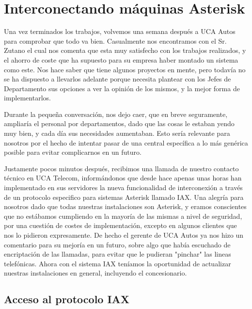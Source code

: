 \newpage

\color[rgb]{0,0,1}

\section{Interconectando máquinas Asterisk}

Una vez terminados los trabajos, volvemos una semana después a UCA Autos para comprobar que todo va bien. Casualmente nos encontramos con el Sr. Zutano el cual nos comenta que esta muy satisfecho con los trabajos realizados, y el ahorro de coste que ha supuesto para su empresa haber montado un sistema como este. Nos hace saber que tiene algunos proyectos en mente, pero todavía no se ha dispuesto a llevarlos adelante porque necesita plantear con los Jefes de Departamento sus opciones a ver la opinión de los mismos, y la mejor forma de implementarlos. 

Durante la pequeña conversación, nos dejo caer, que en breve seguramente, ampliaría el personal por departamentos, dado que las cosas le estaban yendo muy bien, y cada día sus necesidades aumentaban. Esto sería relevante para nosotros por el hecho de intentar pasar de una central específica a lo más genérica posible para evitar complicarnos en un futuro.

Justamente pocos minutos después, recibimos una llamada de nuestro contacto técnico en UCA Telecom, informándonos que desde hace apenas unas horas han implementado en sus servidores la nueva funcionalidad de interconexión a través de un protocolo especifico para sistemas Asterisk llamado IAX. Una alegría para nosotros dado que todas nuestras instalaciones son Asterisk, y eramos conscientes que no estábamos cumpliendo en la mayoría de las mismas a nivel de seguridad, por una cuestión de costes de implementación, excepto en algunos clientes que nos lo pidieron expresamente. De hecho el gerente de UCA Autos ya nos hizo un comentario para su mejoría en un futuro, sobre algo que había escuchado de encriptación de las llamadas, para evitar que le pudieran "pinchar" las lineas telefónicas. Ahora con el sistema IAX teníamos la oportunidad de actualizar nuestras instalaciones en general, incluyendo el concesionario.

\newpage

\color[rgb]{0,0,0}

\subsection{Acceso al protocolo IAX}

